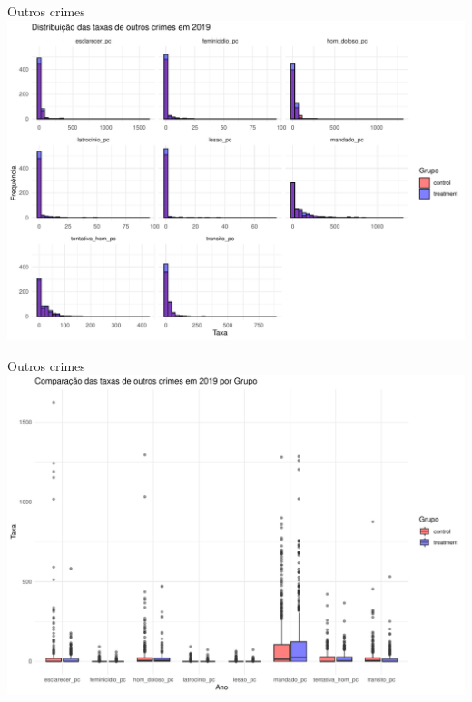\documentclass[
  ignorenonframetext,
]{beamer}
\begin{document}
\begin{frame}{Outros crimes}
\label{outros-crimes}
\includegraphics{graficos_files/figure-beamer/unnamed-chunk-17-1.pdf}
\end{frame}

\begin{frame}{Outros crimes}
\label{outros-crimes-1}
\includegraphics{graficos_files/figure-beamer/unnamed-chunk-18-1.pdf}
\end{frame}
\end{document}
